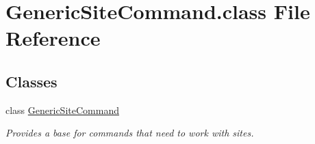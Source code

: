 \hypertarget{GenericSiteCommand_8class}{\section{Generic\-Site\-Command.\-class File Reference}
\label{GenericSiteCommand_8class}
}
\subsection*{Classes}
\begin{DoxyCompactItemize}
\item 
class \hyperlink{classGenericSiteCommand}{Generic\-Site\-Command}
\begin{DoxyCompactList}\small\item\em Provides a base for commands that need to work with sites. \end{DoxyCompactList}\end{DoxyCompactItemize}
